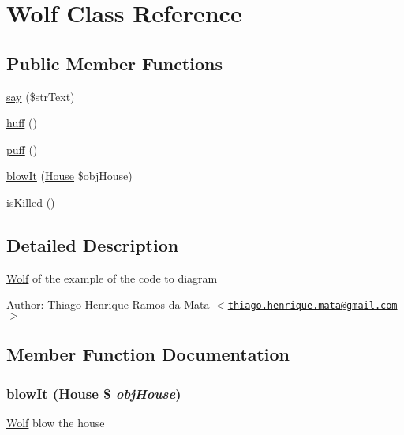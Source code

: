 \hypertarget{class_wolf}{
\section{Wolf Class Reference}
\label{class_wolf}
}
\subsection*{Public Member Functions}
\begin{CompactItemize}
\item 
\hyperlink{class_wolf_0d2d86aa9b7de45757e2d29384b1e549}{say} (\$strText)
\item 
\hyperlink{class_wolf_5f459b17559a1eca24d746db4f77fac0}{huff} ()
\item 
\hyperlink{class_wolf_b5eff6bb92e5551d9188160b85e5cc19}{puff} ()
\item 
\hyperlink{class_wolf_9aad8c39845a1148d9088c6c4249a5e6}{blowIt} (\hyperlink{class_house}{House} \$objHouse)
\item 
\hyperlink{class_wolf_ec29070d2544b3cfe0447dcbc5e6c199}{isKilled} ()
\end{CompactItemize}


\subsection{Detailed Description}
\hyperlink{class_wolf}{Wolf} of the example of the code to diagram

\begin{Desc}
\item[Author:]Thiago Henrique Ramos da Mata $<$\href{mailto:thiago.henrique.mata@gmail.com}{\tt thiago.henrique.mata@gmail.com}$>$ \end{Desc}


\subsection{Member Function Documentation}
\hypertarget{class_wolf_9aad8c39845a1148d9088c6c4249a5e6}{
\subsubsection[{blowIt}]{\setlength{\rightskip}{0pt plus 5cm}blowIt ({\bf House} \$ {\em objHouse})}}
\label{class_wolf_9aad8c39845a1148d9088c6c4249a5e6}


\hyperlink{class_wolf}{Wolf} blow the house 

